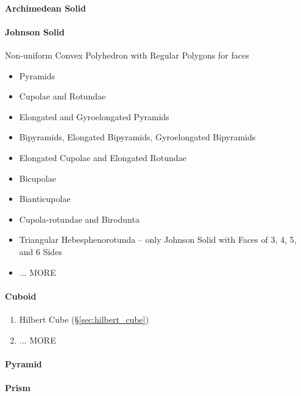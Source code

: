 \paragraph{Archimedean Solid}\label{sec:archimedean_solid}\hfill

\paragraph{Johnson Solid}\label{sec:johnson_solid}\hfill

Non-uniform Convex Polyhedron with Regular Polygons for faces

\begin{itemize}
  \item Pyramids
  \item Cupolae and Rotundae
  \item Elongated and Gyroelongated Pyramids
  \item Bipyramids, Elongated Bipyramids, Gyroelongated Bipyramids
  \item Elongated Cupolae and Elongated Rotundae
  \item Bicupolae
  \item Bianticupolae
  \item Cupola-rotundae and Birodunta
  \item Triangular Hebesphenorotunda -- only Johnson Solid with Faces of 3, 4,
    5, and 6 Sides
  \item ... MORE
\end{itemize}



\paragraph{Cuboid}\label{sec:cuboid}\hfill

\begin{enumerate}
  \item Hilbert Cube (\S\ref{sec:hilbert_cube})
  \item ... MORE
\end{enumerate}



\paragraph{Pyramid}\label{sec:pyramid}\hfill

\paragraph{Prism}\label{sec:prism}\hfill

